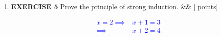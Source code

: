 \documentclass[12pt]{article}
\newcommand{\points}[1]{\hfill {[#1 points]}}
\newcommand{\problem}[2][]{%
  \item {#2}%
  \ifx&#1&%
  \else%
    \points{#1}%
  \fi
  \par\vspace{0.5em}
}
\begin{document}
\begin{enumerate}[leftmargin=*, label=\textbf{\arabic*.}]
\begin{enumerate}
	\problem{If $a > b$, then $a\text{++} > b$}	
	\textcolor{blue}{Let $a > b$. We have that $a\text{++} > a$ by definition ($a\text{++} = a + 1$). Putting these together, we have $a\text{++} > a > b$. By transitivity (proved earlier), $a\text{++} > b$.}
	
	\problem{If $a = b$, then $a\text{++} > b$}	
	\textcolor{blue}{Let $a = b$. Then $a\text{++} = b\text{++} > b \implies a\text{++} > b$.}
	\end{enumerate}
	
	\problem{\textbf{EXERCISE 5} Prove the principle of strong induction.}
	\textcolor{blue}{
	\begin{align*}
	x=2 \implies& x+1=3 \\
	\implies& x+2 = 4
	\end{align*}
	}
	
\end{enumerate}
\end{document}
